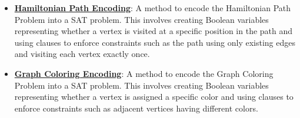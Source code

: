 \documentclass{article}%
\begin{document}
\begin{itemize}[leftmargin=*]
\item \href{https://purdue.brightspace.com/d2l/common/assets/pdfjs-d2l-dist/1.0.14-legacy/web/viewer.html?file=\%2Fcontent\%2Fenforced\%2F1095467-wl.202510.CS.24300.001\%2F15L2-SAT.pdf\%3Fou\%3D1095467\&lang=en-us\&container=d2l-fileviewer-rendered-pdf\&fullscreen=d2l-fileviewer-rendered-pdf-dialog\&height=667#page=40}{\textbf{Hamiltonian Path Encoding}}: A method to encode the Hamiltonian Path Problem into a SAT problem. This involves creating Boolean variables representing whether a vertex is visited at a specific position in the path and using clauses to enforce constraints such as the path using only existing edges and visiting each vertex exactly once.%
\item \href{https://purdue.brightspace.com/d2l/common/assets/pdfjs-d2l-dist/1.0.14-legacy/web/viewer.html?file=\%2Fcontent\%2Fenforced\%2F1095467-wl.202510.CS.24300.001\%2F15L2-SAT.pdf\%3Fou\%3D1095467\&lang=en-us\&container=d2l-fileviewer-rendered-pdf\&fullscreen=d2l-fileviewer-rendered-pdf-dialog\&height=667#page=47}{\textbf{Graph Coloring Encoding}}: A method to encode the Graph Coloring Problem into a SAT problem. This involves creating Boolean variables representing whether a vertex is assigned a specific color and using clauses to enforce constraints such as adjacent vertices having different colors.%
\end{itemize}%
\end{document}
